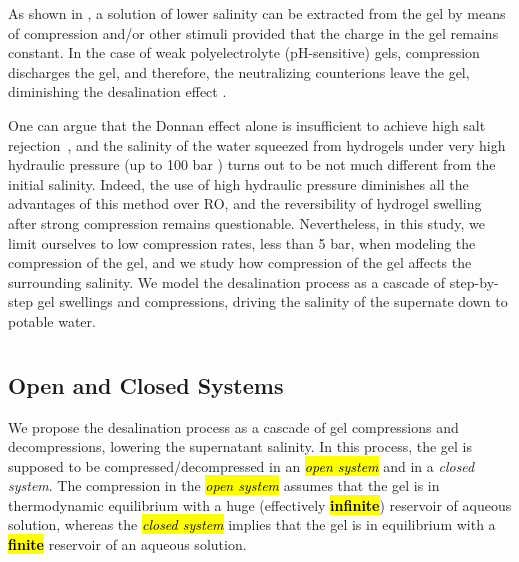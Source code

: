 \documentclass[gels,article,accept,pdftex,moreauthors]{Definitions/mdpi}
\begin{document}
As shown in \cite{Li2011, Ali2015, Arens_2017, Fengler_2020}, a solution of lower salinity can be extracted from the gel by means of compression and/or other stimuli provided that the charge in the gel remains constant.
In the case of weak polyelectrolyte (pH-sensitive) gels, compression discharges the gel, and therefore, the neutralizing counterions leave the gel, diminishing the desalination effect \cite{Rud2018}.

One can argue that the Donnan effect alone is insufficient to achieve high salt rejection~\cite{Cai2016}, and the salinity of the water squeezed from hydrogels under very high hydraulic pressure (up to 100 bar \cite{Fengler_2020}) turns out to be not much different from the initial salinity.
Indeed, the use of high hydraulic pressure diminishes all the advantages of this method over RO, and the reversibility of hydrogel swelling after strong compression remains questionable.
Nevertheless, in this study, we limit ourselves to low compression rates, less than 5 bar, when modeling the compression of the gel, and we study how compression of the gel affects the surrounding salinity.
We model the desalination process as a cascade of step-by-step gel swellings and compressions, driving the salinity of the supernate down to potable water.

\section{ %
\label{sec: theory}}



\subsection{Open and Closed Systems}


We propose the desalination process as a cascade of gel compressions and decompressions, lowering the  supernatant salinity.
In this process, the gel is supposed to be compressed/decompressed in an \emph{\hl{open system} %
} and in a \emph{closed system}.
The compression in the \emph{\hl{open system}} assumes that the gel is in thermodynamic equilibrium with a huge (effectively \textbf{\hl{infinite}}) reservoir of aqueous solution, whereas 
the \emph{\hl{closed system}} implies that the gel is in equilibrium with a \textbf{\hl{finite} %
} reservoir of an aqueous solution.  
\end{document}
